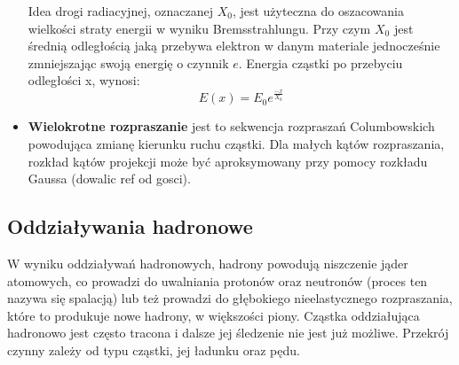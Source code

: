 \begin{itemize}
Idea drogi radiacyjnej, oznaczanej $X_0$, jest użyteczna do oszacowania wielkości straty energii w wyniku Bremsstrahlungu. Przy czym  $X_0$ jest średnią odległością jaką przebywa elektron w danym materiale jednocześnie zmniejszając swoją energię o czynnik $e$. Energia cząstki po przebyciu odległości x, wynosi:
\begin{equation}
E(x)=E_0e^{\frac{-x}{X_0}}
\end{equation}
\item \textbf{Wielokrotne rozpraszanie} jest to sekwencja rozpraszań Columbowskich powodująca zmianę kierunku ruchu cząstki. Dla małych kątów rozpraszania, rozkład kątów projekcji może być aproksymowany przy pomocy rozkładu Gaussa (dowalic ref od gosci).  
\end{itemize}
\subsection{Oddziaływania hadronowe}
W wyniku oddziaływań hadronowych, hadrony powodują niszczenie jąder atomowych, co prowadzi do uwalniania protonów oraz neutronów (proces ten nazywa się spalacją) lub też prowadzi do głębokiego nieelastycznego rozpraszania, które to produkuje nowe hadrony, w większości piony. 
Cząstka oddziałująca hadronowo jest często tracona i dalsze jej śledzenie nie jest już możliwe. Przekrój czynny zależy od typu cząstki, jej ładunku oraz pędu. 

